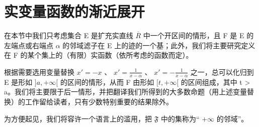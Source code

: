 \section{实变量函数的渐近展开}

在本节中我们只考虑集合 E 是扩充实直线 \(\overline{R}\) 中一个开区间的情形，且 F 是 E 的左端点或右端点 \(\alpha\) 的邻域滤子在 E 上的迹的一个基；此外，我们将主要研究定义在 F 的某个集上的（有限）实函数（依所考虑的函数而定）。

根据需要选用变量替换 \(x' = -x\) 、 \(x' = \frac{1}{x - \alpha}\) 、 \(x' = -\frac{1}{x - \alpha}\) 之一，总可以化归到 E 是形如 \(]a, +\infty[\) 的区间的情形，从而 F 由形如 \([t, +\infty[\) 的区间组成，其中 t \textgreater{} a。我们将主要限于后一情形，并把翻译我们所得到的大多数命题（用上述变量替换）的工作留给读者，只有少数特别重要的结果除外。

为方便起见，我们将容许一个语言上的滥用，把 \(\mathfrak{F}\) 中的集称为`` \(+\infty\) 的邻域''。

